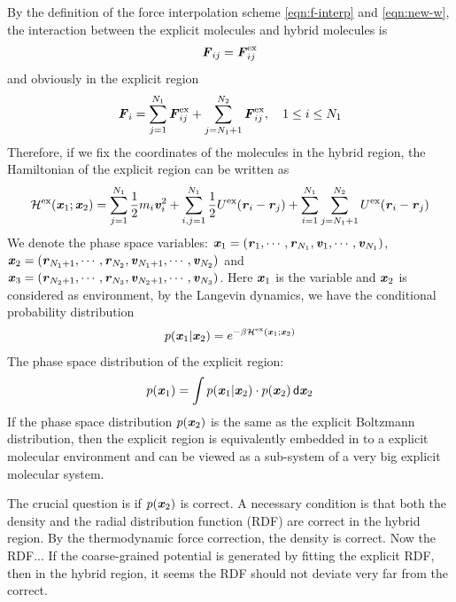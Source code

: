 \documentclass[aps,pre,preprint,unsortedaddress]{revtex4}
\newcommand{\redc}[1]{{\color{red} #1}}
\renewcommand{\v}[1]{\textbf{\textit{#1}}}
\renewcommand{\d}[1]{\textsf{#1}}
\begin{document}
By the definition of the force interpolation scheme
\eqref{eqn:f-interp} and \eqref{eqn:new-w}, the interaction between the
explicit molecules and hybrid molecules is
\begin{align}
  \v F_{ij} = \v F^{\textrm{ex}}_{ij}
\end{align}
and obviously in the explicit region
\begin{align}
  \v F_i =
  \sum_{j=1}^{N_1}\v F^{\textrm{ex}}_{ij} + \sum_{j=N_1+1}^{N_2}\v F^{\textrm{ex}}_{ij}, \quad 1\leq i \leq N_1
\end{align}
Therefore, if we fix the coordinates of the molecules in the hybrid
region, the Hamiltonian of the explicit region can be written as
\begin{align}
  \mathcal H^{\textrm{ex}}(\v x_1; \v x_2) =
  \sum_{j=1}^{N_1}\frac12 m_i\v v_i^2 + 
  \sum_{i,j=1}^{N_1}\frac12 U^{\textrm{ex}}(\v r_i - \v r_j) + 
  \sum_{i=1}^{N_1}\sum_{j=N_1+1}^{N_2} U^{\textrm{ex}}(\v r_i - \v r_j) 
\end{align}
We denote the phase space variables: $\v x_1 = (\v r_1, \cdots, \v
r_{N_1}, \v v_1, \cdots, \v v_{N_1})$,  $\v x_2 = (\v r_{N_1+1},
\cdots, \v r_{N_2}, \v v_{N_1+1}, \cdots, \v v_{N_2})$ and
$\v x_3 = (\v r_{N_2+1},
\cdots, \v r_{N_3}, \v v_{N_2+1}, \cdots, \v v_{N_3})$.
Here $\v x_1$ is the variable and $\v x_2$ is considered as environment, 
by the Langevin dynamics, we have the conditional probability distribution
\begin{align}
  p (\v x_1 \vert \v x_2)  =
  e^{-\beta \mathcal H^{\textrm{ex}}(\v x_1; \v x_2)}
\end{align}
The phase space distribution of the explicit region:
\begin{align}
  p(\v x_1) = \int p(\v x_1\vert\v x_2)\cdot p (\v x_2) \,\d d\v x_2
\end{align}
If the phase space distribution $p(\v x_2)$ is the same as the explicit
Boltzmann distribution, then the explicit region is
equivalently embedded in to a explicit molecular environment and can be
viewed as a sub-system of a very big explicit molecular
system.

The crucial question is if $p(\v x_2)$ is correct.  A necessary
condition is that both the density and the radial distribution
function (RDF) are correct in the hybrid region. By the thermodynamic
force correction, the density is correct. Now the RDF...  If the
coarse-grained potential is generated by fitting the explicit RDF,
\redc{then in the hybrid region, it seems the RDF should not deviate very
  far from the correct.}
\end{document}
